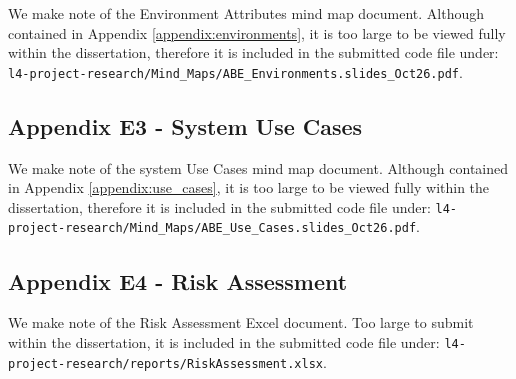 \begin{appendices}
We make note of the Environment Attributes mind map document. Although contained in Appendix \ref{appendix:environments}, it is too large to be viewed fully within the dissertation, therefore it is included in the submitted code file under: \texttt{l4-project-research/Mind\_Maps/ABE\_Environments.slides\_Oct26.pdf}.

\subsection{Appendix E3 - System Use Cases}
\label{appendix:e_use_cases}

We make note of the system Use Cases mind map document. Although contained in Appendix \ref{appendix:use_cases}, it is too large to be viewed fully within the dissertation, therefore it is included in the submitted code file under: \texttt{l4-project-research/Mind\_Maps/ABE\_Use\_Cases.slides\_Oct26.pdf}.

\subsection{Appendix E4 - Risk Assessment}
\label{appendix:e_risk_assessment}

We make note of the Risk Assessment Excel document. Too large to submit within the dissertation, it is included in the submitted code file under: \texttt{l4-project-research/reports/RiskAssessment.xlsx}.

\end{appendices}
